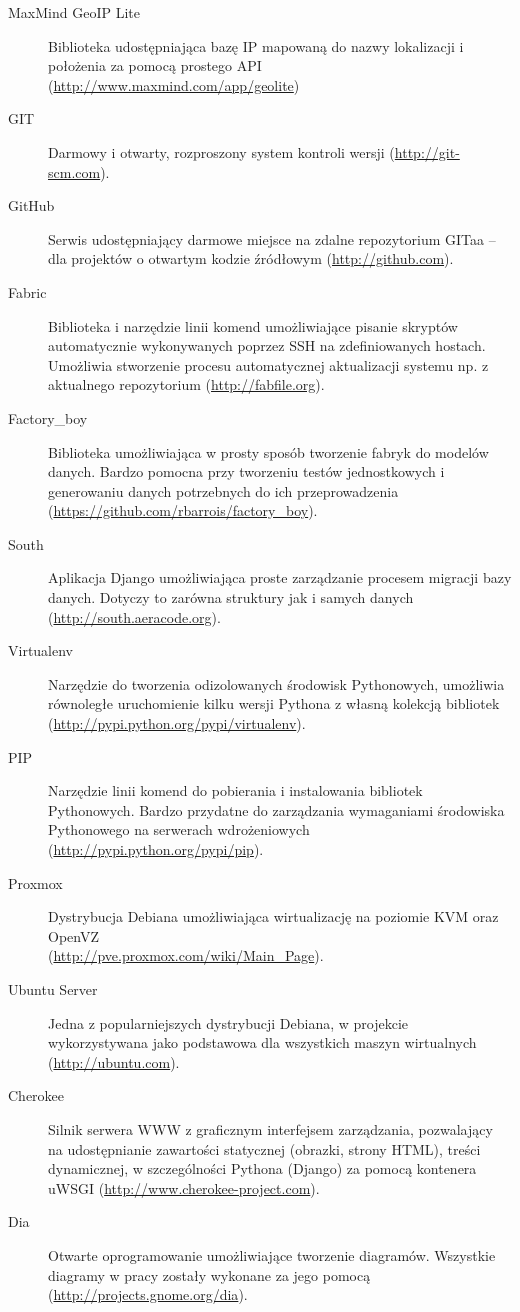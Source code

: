 \begin{description}
    \item[MaxMind GeoIP Lite] Biblioteka udostępniająca bazę IP mapowaną do nazwy lokalizacji i położenia za pomocą prostego API (\url{http://www.maxmind.com/app/geolite})
    \item[GIT] Darmowy i otwarty, rozproszony system kontroli wersji (\url{http://git-scm.com}).
    \item[GitHub] Serwis udostępniający darmowe miejsce na zdalne repozytorium GITaa -- dla projektów o otwartym kodzie źródłowym (\url{http://github.com}).
    \item[Fabric] Biblioteka i narzędzie linii komend umożliwiające pisanie skryptów automatycznie wykonywanych poprzez SSH na zdefiniowanych hostach. Umożliwia stworzenie procesu automatycznej aktualizacji systemu np. z aktualnego repozytorium (\url{http://fabfile.org}).
    \item[Factory\_boy] Biblioteka umożliwiająca w prosty sposób tworzenie fabryk do modelów danych. Bardzo pomocna przy tworzeniu testów jednostkowych i generowaniu danych potrzebnych do ich przeprowadzenia \\(\url{https://github.com/rbarrois/factory\_boy}).
    \item[South] Aplikacja Django umożliwiająca proste zarządzanie procesem migracji bazy danych. Dotyczy to zarówna struktury jak i samych danych (\url{http://south.aeracode.org}).
    \item[Virtualenv] Narzędzie do tworzenia odizolowanych środowisk Pythonowych, umożliwia równoległe uruchomienie kilku wersji Pythona z własną kolekcją bibliotek (\url{http://pypi.python.org/pypi/virtualenv}).
    \item[PIP] Narzędzie linii komend do pobierania i instalowania bibliotek Pythonowych. Bardzo przydatne do zarządzania wymaganiami środowiska Pythonowego na serwerach wdrożeniowych (\url{http://pypi.python.org/pypi/pip}).
    \item[Proxmox] Dystrybucja Debiana umożliwiająca wirtualizację na poziomie KVM oraz OpenVZ \\(\url{http://pve.proxmox.com/wiki/Main_Page}).
    \item[Ubuntu Server] Jedna z popularniejszych dystrybucji Debiana, w projekcie wykorzystywana jako podstawowa dla wszystkich maszyn wirtualnych (\url{http://ubuntu.com}).
    \item[Cherokee] Silnik serwera WWW z graficznym interfejsem zarządzania, pozwalający na udostępnianie zawartości statycznej (obrazki, strony HTML), treści dynamicznej, w szczególności Pythona (Django) za pomocą kontenera uWSGI (\url{http://www.cherokee-project.com}).
    \item[Dia] Otwarte oprogramowanie umożliwiające tworzenie diagramów. Wszystkie diagramy w pracy zostały wykonane za jego pomocą (\url{http://projects.gnome.org/dia}).
\end{description}

\newpage
